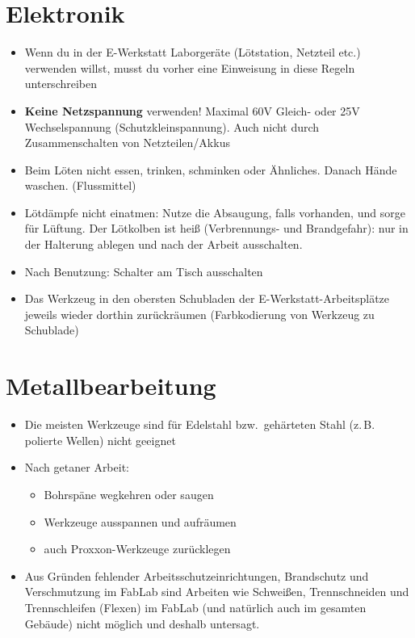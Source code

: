 \documentclass[13pt]{\basedir/fablab-document}
\begin{document}
\section{Elektronik}
\begin{itemize}
  \item Wenn du in der E-Werkstatt Laborgeräte (Lötstation, Netzteil etc.) verwenden willst, musst du vorher eine Einweisung in diese Regeln unterschreiben
  \item \textbf{Keine Netzspannung} verwenden! Maximal 60V Gleich- oder 25V Wechselspannung (Schutzkleinspannung). Auch nicht durch Zusammenschalten von Netzteilen/Akkus

 \item Beim Löten nicht essen, trinken, schminken oder Ähnliches. Danach Hände waschen. (Flussmittel)
 \item Lötdämpfe nicht einatmen: Nutze die Absaugung, falls vorhanden, und sorge für Lüftung. Der Lötkolben ist heiß (Verbrennungs- und Brandgefahr): nur in der Halterung ablegen und nach der Arbeit ausschalten.
 \item Nach Benutzung: Schalter am Tisch ausschalten
 \item Das Werkzeug in den obersten Schubladen der E-Werkstatt-Arbeitsplätze jeweils wieder dorthin zurückräumen (Farbkodierung von Werkzeug zu Schublade)
\end{itemize}


\section{Metallbearbeitung}
\begin{itemize}
	\item Die meisten Werkzeuge sind für Edelstahl bzw.\  gehärteten Stahl (z.\,B. polierte Wellen) nicht geeignet
	\item Nach getaner Arbeit:
	\begin{itemize}
		\item Bohrspäne wegkehren oder saugen
		\item Werkzeuge ausspannen und aufräumen
		\item auch Proxxon-Werkzeuge zurücklegen
	\end{itemize}
	\item Aus Gründen fehlender Arbeitsschutzeinrichtungen, Brandschutz und Verschmutzung im FabLab sind Arbeiten wie Schweißen, Trennschneiden und Trennschleifen (Flexen) im FabLab (und natürlich auch im gesamten Gebäude) nicht möglich und deshalb untersagt.
\end{itemize}
\end{document}
